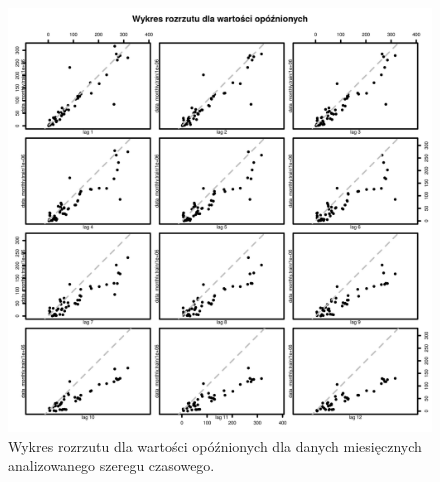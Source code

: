 \documentclass[11pt]{article}
\begin{document}
\begin{figure}[h]

    \centering
	\includegraphics[width=\textwidth]{images/data_monthly_train_opoznienia.png}
    \caption{Wykres rozrzutu dla wartości opóźnionych dla danych miesięcznych analizowanego szeregu czasowego.}
    \label{fig:data_monthly_train_opoznienia}

\end{figure}
\end{document}
